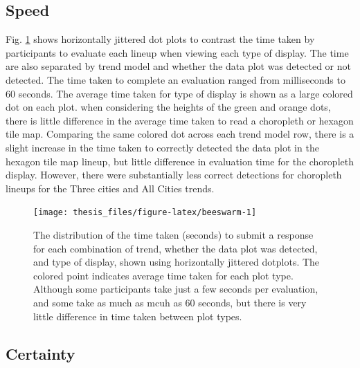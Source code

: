 \documentclass{monashthesis}
\begin{document}
\hypertarget{speed}{%
\subsection{Speed}\label{speed}}

Fig. \ref{fig:beeswarm} shows horizontally jittered dot plots to contrast the time taken by participants to evaluate each lineup when viewing each type of display. The time are also separated by trend model and whether the data plot was detected or not detected. The time taken to complete an evaluation ranged from milliseconds to 60 seconds. The average time taken for type of display is shown as a large colored dot on each plot. when considering the heights of the green and orange dots, there is little difference in the average time taken to read a choropleth or hexagon tile map. Comparing the same colored dot across each trend model row, there is a slight increase in the time taken to correctly detected the data plot in the hexagon tile map lineup, but little difference in evaluation time for the choropleth display. However, there were substantially less correct detections for choropleth lineups for the Three cities and All Cities trends.

\begin{figure}

{\centering \texttt{[image: thesis\_files/figure-latex/beeswarm-1]} 

}

\caption{The distribution of the time taken (seconds) to submit a response for each combination of trend, whether the data plot was detected, and type of display, shown using horizontally jittered dotplots. The colored point indicates average time taken for each plot type. Although some participants take just a few seconds per evaluation, and some take as much as mcuh as 60 seconds, but there is very little difference in time taken between plot types.}\label{fig:beeswarm}
\end{figure}

\hypertarget{certainty}{%
\subsection{Certainty}\label{certainty}}
\end{document}
